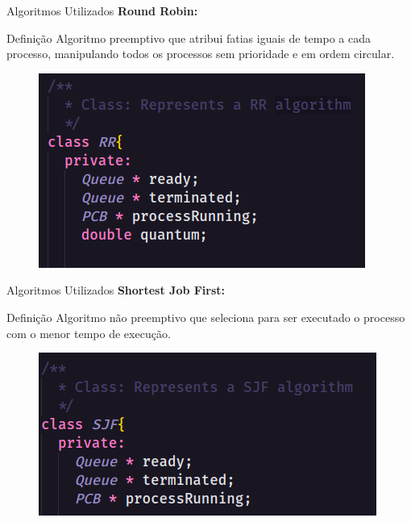\documentclass{beamer}
\begin{document}
\begin{frame}{Algoritmos Utilizados}
    \textbf{Round Robin:}
	\begin{alertblock}{Definição}
Algoritmo preemptivo que atribui fatias iguais de tempo a cada processo, manipulando todos os processos sem prioridade e em ordem circular.
	\end{alertblock}
	\begin{figure}[!htb]
		\centering
		\includegraphics[keepaspectratio, scale=.6]{RR.png}
	\end{figure}
\end{frame}

\begin{frame}{Algoritmos Utilizados}
    \textbf{Shortest Job First:}
	\begin{alertblock}{Definição}
		Algoritmo não preemptivo que seleciona para ser executado o processo com o menor tempo de execução.
	\end{alertblock}
	\begin{figure}[!htb]
		\centering
		\includegraphics[keepaspectratio, scale=.6]{SJF.png}
	\end{figure}
\end{frame}
\end{document}

